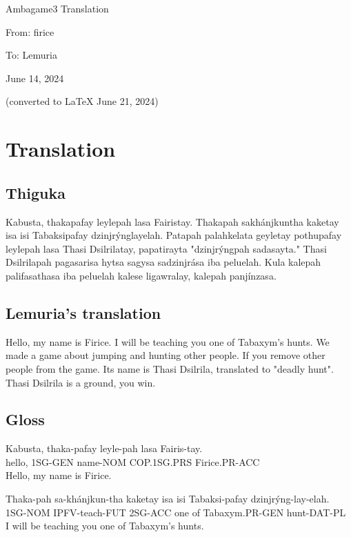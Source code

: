 \documentclass{thiguka}
\begin{document}
Ambagame3 Translation

From: firice

To: Lemuria

June 14, 2024

(converted to \LaTeX{} June 21, 2024)

\section{Translation}
\subsection{Thiguka}

Kabusta, thakapafay leylepah lasa Fairistay. Thakapah sakhánjkuntha kaketay isa isi
Tabaksipafay dzinjrýnglayelah. Patapah palahkelata geyletay pothupafay leylepah lasa
Thasi Dsilrilatay, papatirayta "dzinjrýngpah sadasayta." Thasi Dsilrilapah pagasarisa 
hytsa sagysa sadzinjrása iba peluelah. Kula kalepah palifasathasa iba peluelah kalese 
ligawralay, kalepah panjínzasa.
                            
\subsection{Lemuria's translation}
Hello, my name is Firice. I will be teaching you one of Tabaxym's hunts. We made a
game about jumping and hunting other people. If you remove other people from the
game. Its name is Thasi Dsilrila, translated to "deadly hunt". Thasi Dsilrila is a
ground, you win.


\subsection{Gloss}

\begin{exe}
\ex{} \gll{}Kabusta, thaka-pafay leyle-pah lasa        Fairis-tay.\\
            hello,   1SG-GEN     name-NOM  COP.1SG.PRS Firice.PR-ACC\\
      \glt{}Hello, my name is Firice.
\end{exe}

\begin{exe}
\ex{} \gll{}Thaka-pah sa-khánjkun-tha kaketay isa isi Tabaksi-pafay  dzinjrýng-lay-elah.\\
            1SG-NOM   IPFV-teach-FUT  2SG-ACC one of  Tabaxym.PR-GEN hunt-DAT-PL\\
      \glt{}I will be teaching you one of Tabaxym's hunts.
\end{exe}
\end{document}
